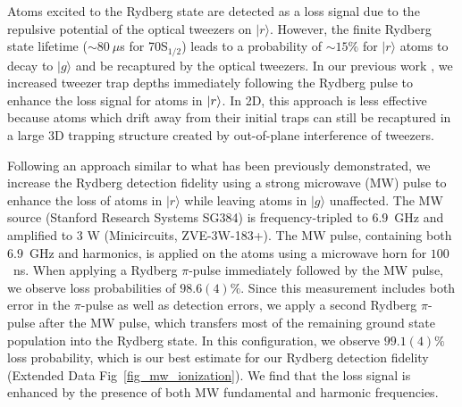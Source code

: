 \documentclass[reprint,twocolumn,secnumarabic,amssymb, aps, prl]{revtex4-1}
\begin{document}
Atoms excited to the Rydberg state are detected as a loss signal due to the repulsive potential of the optical tweezers on $|r \rangle$. However, the finite Rydberg state lifetime\cite{RydbergProperties2009} ($\sim 80~\mu$s for 70S$_{1/2}$) leads to a probability of $\sim 15\%$ for $|r\rangle$ atoms to decay to $|g\rangle$ and be recaptured by the optical tweezers. In our previous work \cite{AtomArrayCats2019}, we increased tweezer trap depths immediately following the Rydberg pulse to enhance the loss signal for atoms in $\ket{r}$. In 2D, this approach is less effective because atoms which drift away from their initial traps can still be recaptured in a large 3D trapping structure created by out-of-plane interference of tweezers.

Following an approach similar to what has been previously demonstrated\cite{Saffman2019}, we increase the Rydberg detection fidelity using a strong microwave (MW) pulse to enhance the loss of atoms in $|r\rangle$ while leaving atoms in $|g\rangle$ unaffected. The MW source (Stanford Research Systems SG384) is frequency-tripled to $6.9$~GHz and amplified to 3 W (Minicircuits, ZVE-3W-183+). The MW pulse, containing both $6.9$~GHz and harmonics, is applied on the atoms using a microwave horn for $100$~ns. When applying a Rydberg $\pi$-pulse immediately followed by the MW pulse, we observe loss probabilities of $98.6(4)\%$. Since this measurement includes both error in the $\pi$-pulse as well as detection errors, we apply a second Rydberg $\pi$-pulse after the MW pulse, which transfers most of the remaining ground state population into the Rydberg state. In this configuration, we observe $99.1(4)\%$ loss probability, which is our best estimate for our Rydberg detection fidelity (Extended Data Fig~\ref{fig_mw_ionization}). We find that the loss signal is enhanced by the presence of both MW fundamental and harmonic frequencies.\\
\end{document}
